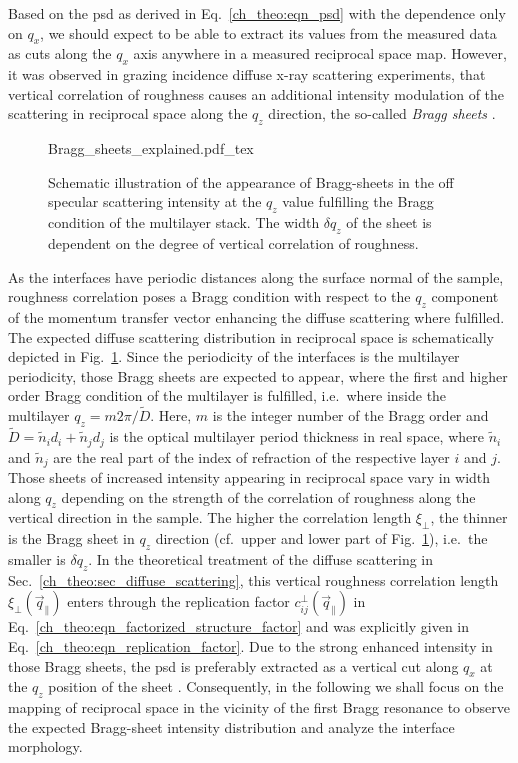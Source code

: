 Based on the \gls{psd} as derived in Eq.~\eqref{ch_theo:eqn_psd} with the dependence only on $q_x$, we should expect to be able to extract its values from the measured data as cuts along the $q_x$ axis anywhere in a measured reciprocal space map. However, it was observed in grazing incidence diffuse x-ray scattering experiments, that vertical correlation of roughness causes an additional intensity modulation of the scattering in reciprocal space along the $q_z$ direction, the so-called \emph{Bragg sheets} \cite{jiang_nonspecular_1992, holy_nonspecular_1994, salditt_kinetic_1994, holy_interface_1995}.
\begin{figure}[htb]
    \def\svgwidth{\textwidth}
    {Bragg_sheets_explained.pdf_tex}
    \caption{Schematic illustration of the appearance of Bragg-sheets in the off specular scattering intensity at the $q_z$ value fulfilling the Bragg condition of the multilayer stack. The width $\delta q_z$ of the sheet is dependent on the degree of vertical correlation of roughness.}
    \label{ch_diff:fig_Bragg_sheets_explained} 
\end{figure}
As the interfaces have periodic distances along the surface normal of the sample, roughness correlation poses a Bragg condition with respect to the $q_z$ component of the momentum transfer vector enhancing the diffuse scattering where fulfilled. The expected diffuse scattering distribution in reciprocal space is schematically depicted in Fig.~\ref{ch_diff:fig_Bragg_sheets_explained}. Since the periodicity of the interfaces is the multilayer periodicity, those Bragg sheets are expected to appear, where the first and higher order Bragg condition of the multilayer is fulfilled, i.e.~where inside the multilayer $q_z=m 2 \pi /\tilde{D}$. Here, $m$ is the integer number of the Bragg order and $\tilde{D} = \tilde{n}_i d_i + \tilde{n}_j d_j$ is the optical multilayer period thickness in real space, where $\tilde{n}_i$ and $\tilde{n}_j$ are the real part of the index of refraction of the respective layer $i$ and $j$. Those sheets of increased intensity appearing in reciprocal space vary in width along $q_z$ depending on the strength of the correlation of roughness along the vertical direction in the sample. The higher the correlation length $\xi_\perp$, the thinner is the Bragg sheet in $q_z$ direction (cf.~upper and lower part of Fig.~\ref{ch_diff:fig_Bragg_sheets_explained}), i.e.~the smaller is $\delta q_z$. In the theoretical treatment of the diffuse scattering in Sec.~\ref{ch_theo:sec_diffuse_scattering}, this vertical roughness correlation length $\xi_\perp(\vec{q}_\parallel)$ enters through the replication factor $c_{ij}^{\perp}(\vec{q}_\parallel)$ in Eq.~\eqref{ch_theo:eqn_factorized_structure_factor} and was explicitly given in Eq.~\eqref{ch_theo:eqn_replication_factor}. Due to the strong enhanced intensity in those Bragg sheets, the \gls{psd} is preferably extracted as a vertical cut along $q_x$ at the $q_z$ position of the sheet \cite{salditt_kinetic_1994,siffalovic_characterization_2009}. Consequently, in the following we shall focus on the mapping of reciprocal space in the vicinity of the first Bragg resonance to observe the expected Bragg-sheet intensity distribution and analyze the interface morphology.

